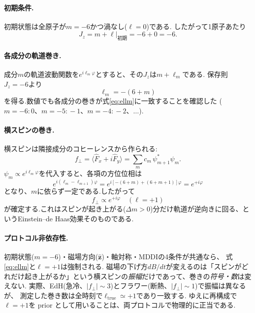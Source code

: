 \documentclass[11pt]{ltjsarticle}
\newcommand{\expv}[1]{\langle #1 \rangle}
\begin{document}
\paragraph{初期条件.}
初期状態は全原子が$m=-6$かつ渦なし($\ell=0$)である.
したがって1原子あたり
\begin{equation}
  J_z=m+\ell\big|_{\text{初期}}=-6+0=-6.
\end{equation}

\paragraph{各成分の軌道巻き.}
成分$m$の軌道波動関数を$e^{i\ell_m\varphi}$とすると、その$J_z$は$m+\ell_m$である.
保存則$J_z=-6$より
\begin{equation}
  \boxed{\;\ell_m=-(6+m)\;}
  \label{eq:ellm}
\end{equation}
を得る.数値でも各成分の巻きが式\eqref{eq:ellm}に一致することを確認した
($m=-6\!:\!0$、$m=-5\!:\!-1$、$m=-4\!:\!-2$、$\dots$).

\paragraph{横スピンの巻き.}
横スピンは隣接成分のコヒーレンスから作られる:
\begin{equation}
  f_\perp=\expv{\hat F_x+i\hat F_y}=\sum_m c_m\,\psi_{m+1}^*\psi_m.
\end{equation}
$\psi_m\propto e^{i\ell_m\varphi}$を代入すると、各項の方位位相は
\begin{equation}
  e^{i(\ell_m-\ell_{m+1})\varphi}
  =e^{i[-(6+m)+(6+m+1)]\varphi}
  =e^{+i\varphi}
\end{equation}
となり、$m$に依らず一定である.したがって
\begin{equation}
  \boxed{\;f_\perp\propto e^{+i\varphi}\quad(\ell=+1)\;}
\end{equation}
が確定する.これはスピンが起き上がる($\Delta m>0$)分だけ軌道が逆向きに回る、というEinstein--de Haas効果そのものである.

\paragraph{プロトコル非依存性.}
初期状態($m=-6$)・磁場方向($\hat{\bm z}$)・軸対称・MDDIの4条件が共通なら、
式\eqref{eq:ellm}と$\ell=+1$は強制される.
磁場の下げ方$dB/dt$が変えるのは「スピンがどれだけ起き上がるか」という横スピンの\emph{振幅}だけであって、巻きの\emph{符号・数}は変えない.
実際、EdH(急冷、$|f_\perp|\sim3$)とフラワー(断熱、$|f_\perp|\sim1$)で振幅は異なるが、
測定した巻き数は全時刻で$\ell_{\mathrm{true}}\simeq+1$であり一致する.
ゆえに再構成で$\ell=+1$を prior として用いることは、両プロトコルで物理的に正当である.
\end{document}
